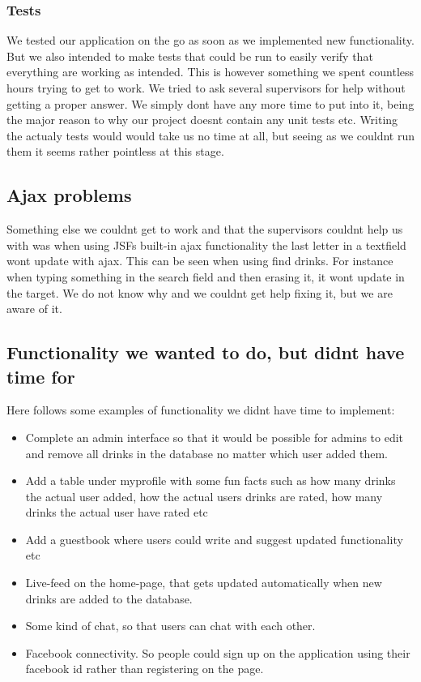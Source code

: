 \documentclass[a4paper]{article}
\begin{document}
\subsubsection{Tests}
We tested our application on the go as soon as we implemented new functionality. But we also intended to make tests that could be run to easily verify that everything are working as intended. This is however something we spent countless hours trying to get to work. We tried to ask several supervisors for help without getting a proper answer. We simply dont have any more time to put into it, being the major reason to why our project doesnt contain any unit tests etc. Writing the actualy tests would would take us no time at all, but seeing as we couldnt run them it seems rather pointless at this stage.

\subsection{Ajax problems}
Something else we couldnt get to work and that the supervisors couldnt help us with was when using JSFs built-in ajax functionality the last letter in a textfield wont update with ajax.
This can be seen when using find drinks. For instance when typing something in the search field and then erasing it, it wont update in the target. We do not know why and we couldnt get help fixing it, but we are aware of it.

\subsection{Functionality we wanted to do, but didnt have time for}
Here follows some examples of functionality we didnt have time to implement:
\begin{itemize}
\item Complete an admin interface so that it would be possible for admins to edit and remove all drinks in the database no matter which user added them.
\item Add a table under myprofile with some fun facts such as how many drinks the actual user added, how the actual users drinks are rated, how many drinks the actual user have rated etc
\item Add a guestbook where users could write and suggest updated functionality etc
\item Live-feed on the home-page, that gets updated automatically when new drinks are added to the database.
\item Some kind of chat, so that users can chat with each other.
\item Facebook connectivity. So people could sign up on the application using their facebook id rather than registering on the page.
\end{itemize}
\end{document}
